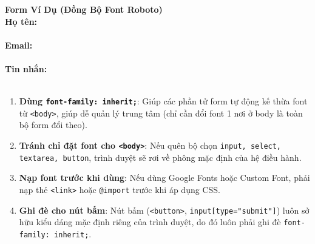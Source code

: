 \documentclass[11pt,oneside]{book}
\newcommand{\codeinline}[1]{\textcolor{accentOrange}{\texttt{#1}}}
\begin{document}
\begin{browserWindow}
\sffamily\small
{\bfseries\large Form Ví Dụ (Đồng Bộ Font Roboto)}\\[6pt]
\textbf{Họ tên:}\\[2pt]
\\[6pt]
\textbf{Email:}\\[2pt]
\\[6pt]
\textbf{Tin nhắn:}\\[2pt]
\\[8pt]
\end{browserWindow}

\begin{warnBox}
\begin{enumerate}[leftmargin=1.5em, itemsep=4pt, parsep=0pt]
    \item \textbf{Dùng \codeinline{font-family: inherit;}}: Giúp các phần tử form tự động kế thừa font từ \codeinline{<body>}, giúp dễ quản lý trung tâm (chỉ cần đổi font 1 nơi ở body là toàn bộ form đổi theo).
    \item \textbf{Tránh chỉ đặt font cho \codeinline{<body>}}: Nếu quên bộ chọn \codeinline{input, select, textarea, button}, trình duyệt sẽ rơi về phông mặc định của hệ điều hành.
    \item \textbf{Nạp font trước khi dùng}: Nếu dùng Google Fonts hoặc Custom Font, phải nạp thẻ \codeinline{<link>} hoặc \codeinline{@import} trước khi áp dụng CSS.
    \item \textbf{Ghi đè cho nút bấm}: Nút bấm (\codeinline{<button>}, \codeinline{input[type="submit"]}) luôn sở hữu kiểu dáng mặc định riêng của trình duyệt, do đó luôn phải ghi đè \codeinline{font-family: inherit;}.
\end{enumerate}
\end{warnBox}

\end{document}
